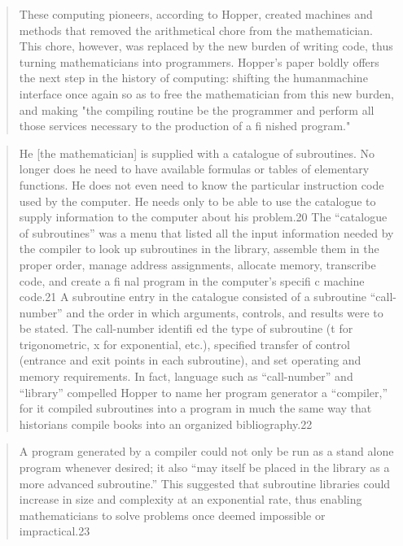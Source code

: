 \begin{quotation}
These computing pioneers, according to
Hopper, created machines and methods that removed the arithmetical chore from the mathematician. This chore, however, was
replaced by the new burden of writing code, thus turning mathematicians into programmers. Hopper's paper boldly offers the
next step in the history of computing: shifting the humanmachine interface once again so as to free the mathematician
from this new burden, and making "the compiling routine be
the programmer and perform all those services necessary to the
production of a fi nished program."
\end{quotation}

\begin{quotation}
He [the mathematician] is supplied with a catalogue of subroutines. No
longer does he need to have available formulas or tables of elementary
functions. He does not even need to know the particular instruction
code used by the computer. He needs only to be able to use the catalogue to supply information to the computer about his problem.20
The “catalogue of subroutines” was a menu that listed all the
input information needed by the compiler to look up subroutines in the library, assemble them in the proper order, manage
address assignments, allocate memory, transcribe code, and create
a fi nal program in the computer’s specifi c machine code.21 A
subroutine entry in the catalogue consisted of a subroutine
“call-number” and the order in which arguments, controls, and
results were to be stated. The call-number identifi ed the type of
subroutine (t for trigonometric, x for exponential, etc.), specified
transfer of control (entrance and exit points in each subroutine),
and set operating and memory requirements. In fact, language
such as “call-number” and “library” compelled Hopper to name
her program generator a “compiler,” for it compiled subroutines
into a program in much the same way that historians compile
books into an organized bibliography.22
\end{quotation}

\begin{quotation}
A program generated by a compiler could not only be
run as a stand alone program whenever desired; it also “may itself
be placed in the library as a more advanced subroutine.” This
suggested that subroutine libraries could increase in size and
complexity at an exponential rate, thus enabling mathematicians
to solve problems once deemed impossible or impractical.23
\end{quotation}

